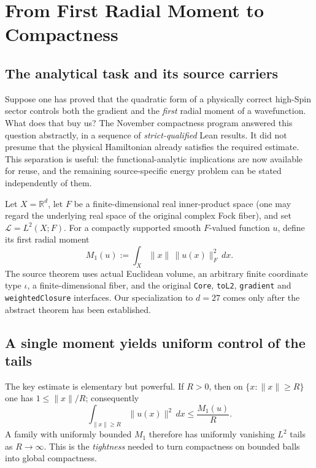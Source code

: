 \chapter{From First Radial Moment to Compactness}
\label{ch:compactness}

\section{The analytical task and its source carriers}
Suppose one has proved that the quadratic form of a physically correct
high-Spin sector controls both the gradient and the \emph{first} radial
moment of a wavefunction. What does that buy us?
The November compactness program answered this question abstractly, in
a sequence of \emph{strict-qualified} Lean results. It did not presume
that the physical Hamiltonian already satisfies the required estimate.
This separation is useful: the functional-analytic implications are now
available for reuse, and the remaining source-specific energy problem
can be stated independently of them.

Let \(X=\mathbb R^d\), let \(F\) be a finite-dimensional real inner-product
space (one may regard the underlying real space of the original complex
Fock fiber), and set \(\mathscr L=L^2(X;F)\). For a compactly supported
smooth \(F\)-valued function \(u\), define its first radial moment
\begin{equation}\label{eq:first-moment}
 M_1(u):=\int_X\|x\|\,\|u(x)\|_F^2\,dx.
\end{equation}
The source theorem uses actual Euclidean volume, an arbitrary finite
coordinate type \(\iota\), a finite-dimensional fiber, and the
original \texttt{Core}, \texttt{toL2}, \texttt{gradient} and
\texttt{weightedClosure} interfaces. Our specialization to \(d=27\)
comes only after the abstract theorem has been established.

\section{A single moment yields uniform control of the tails}
The key estimate is elementary but powerful. If \(R>0\), then on
\(\{x:\|x\|\ge R\}\) one has \(1\le\|x\|/R\); consequently
\begin{equation}\label{eq:tail-control}
 \int_{\|x\|\ge R}\|u(x)\|^2\,dx
 \le\frac{M_1(u)}{R}.
\end{equation}
A family with uniformly bounded \(M_1\) therefore has uniformly
vanishing \(L^2\) tails as \(R\to\infty\). This is the
\emph{tightness} needed to turn compactness on bounded balls into
global compactness.

